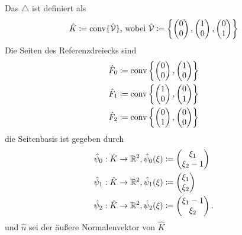 \begin{define}
	
	Das  $ \triangle $ ist definiert als
	 \[ \hat{K} \coloneqq \operatorname{conv} \{ \hat{\mathcal{V}} \} \text{, wobei } \hat{\mathcal{V}} \coloneqq \left\{ 
	 \begin{pmatrix}
		 0\\
		 0
	 \end{pmatrix},
	 \begin{pmatrix}
		 1\\
		 0
	 \end{pmatrix},
	 \begin{pmatrix}
		 0\\
		 1
	 \end{pmatrix} \right\} \]
	Die Seiten des Referenzdreiecks sind
	\begin{align*}
	 	\hat{F}_0 &\coloneqq \operatorname{conv} \left\{ 
	 	\begin{pmatrix}
	 		0\\
	 		0
	 	\end{pmatrix},
	 	\begin{pmatrix}
		 	1\\
		 	0
	 	\end{pmatrix} \right\}\\
	 	\hat{F}_1 &\coloneqq \operatorname{conv} \left\{ 
	 	\begin{pmatrix}
		 	1\\
		 	0
	 	\end{pmatrix},
	 	\begin{pmatrix}
		 	0\\
		 	1
	 	\end{pmatrix} \right\}\\
	 	\hat{F}_2 &\coloneqq \operatorname{conv} \left\{ 
	 	\begin{pmatrix}
		 	0\\
		 	1
	 	\end{pmatrix},
	 	\begin{pmatrix}
		 	0\\
		 	0
	 	\end{pmatrix} \right\}\\ 	
	\end{align*}
	die Seitenbasis ist gegeben durch
	\begin{align*}
	 	\hat{\psi}_0:\hat{K} \to \mathbb{R}^2, \hat{\psi}_0(\xi) &\coloneqq 
	 	\begin{pmatrix}
	 		\xi_1\\
	 		\xi_2-1
	 	\end{pmatrix}\\
	 	\hat{\psi}_1:\hat{K} \to \mathbb{R}^2, \hat{\psi}_1(\xi) &\coloneqq  
	 	\begin{pmatrix}
		 	\xi_1\\
		 	\xi_2
	 	\end{pmatrix}\\
	 	\hat{\psi}_2:\hat{K} \to \mathbb{R}^2, \hat{\psi}_2(\xi) &\coloneqq 
	 	\begin{pmatrix}
		 	\xi_1-1\\
		 	\xi_2
	 	\end{pmatrix}.
	\end{align*}
	und $ \hat{n} $ sei der äußere Normalenvektor von $ \hat{K} $
\end{define}

